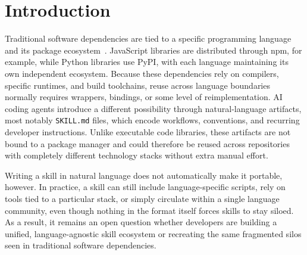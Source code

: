 
\begin{abstract}
Agent skills are \texttt{SKILL.md} files written in natural language, so unlike code libraries, which are tied to one language's package ecosystem, they could in principle be reused in any project. Using the GitSkills dataset (3.8 million \texttt{SKILL.md} files in 282,200 GitHub repositories), we find that exact copies of skills often cross programming languages, but far less than in a baseline where language plays no role (57.6\% vs.\ 87.0\%). Those cross-language ties mostly follow shared runtimes and platforms. Since skills that cross languages and skills that do not look almost the same, agent skills seem to reproduce the language silos of package ecosystems for social rather than technical reasons.
\end{abstract}

\section{Introduction}
Traditional software dependencies are tied to a specific programming language and its package ecosystem~\cite{decan2019empirical}. JavaScript libraries are distributed through npm, for example, while Python libraries use PyPI, with each language maintaining its own independent ecosystem. Because these dependencies rely on compilers, specific runtimes, and build toolchains, reuse across language boundaries normally requires wrappers, bindings, or some level of reimplementation. AI coding agents introduce a different possibility through natural-language artifacts, most notably \texttt{SKILL.md} files, which encode workflows, conventions, and recurring developer instructions. Unlike executable code libraries, these artifacts are not bound to a package manager and could therefore be reused across repositories with completely different technology stacks without extra manual effort.

Writing a skill in natural language does not automatically make it portable, however. In practice, a skill can still include language-specific scripts, rely on tools tied to a particular stack, or simply circulate within a single language community, even though nothing in the format itself forces skills to stay siloed. As a result, it remains an open question whether developers are building a unified, language-agnostic skill ecosystem or recreating the same fragmented silos seen in traditional software dependencies.

